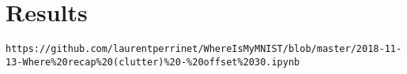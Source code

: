 \section{Results}
\label{sec:results}

\verb|https://github.com/laurentperrinet/WhereIsMyMNIST/blob/master/2018-11-13-Where%20recap%20(clutter)%20-%20offset%2030.ipynb|

